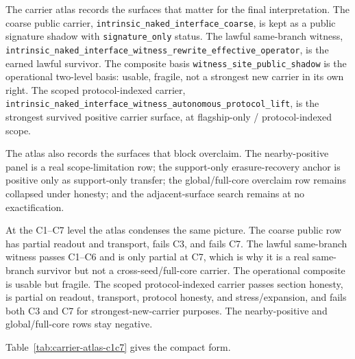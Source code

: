 \documentclass[11pt]{article}
\theoremstyle{definition}
\begin{document}
The carrier atlas records the surfaces that matter for the final interpretation. The
coarse public carrier, \nolinkurl{intrinsic_naked_interface_coarse}, is kept as a
public signature shadow with \texttt{signature\_only} status. The lawful same-branch
witness, \nolinkurl{intrinsic_naked_interface_witness_rewrite_effective_operator}, is
the earned lawful survivor. The composite basis
\nolinkurl{witness_site_public_shadow} is the operational two-level basis: usable,
fragile, not a strongest new carrier in its own right. The scoped protocol-indexed
carrier, \nolinkurl{intrinsic_naked_interface_witness_autonomous_protocol_lift}, is
the strongest survived positive carrier surface, at flagship-only / protocol-indexed
scope.

The atlas also records the surfaces that block overclaim. The nearby-positive panel
is a real scope-limitation row; the support-only erasure-recovery anchor is positive
only as support-only transfer; the global/full-core overclaim row remains collapsed
under honesty; and the adjacent-surface search remains at no exactification.

At the C1--C7 level the atlas condenses the same picture. The coarse public row has
partial readout and transport, fails C3, and fails C7. The lawful same-branch witness
passes C1--C6 and is only partial at C7, which is why it is a real same-branch
survivor but not a cross-seed/full-core carrier. The operational composite is usable
but fragile. The scoped protocol-indexed carrier passes section honesty, is partial
on readout, transport, protocol honesty, and stress/expansion, and fails both C3 and
C7 for strongest-new-carrier purposes. The nearby-positive and global/full-core rows
stay negative.

Table~\ref{tab:carrier-atlas-c1c7} gives the compact form.
\end{document}
